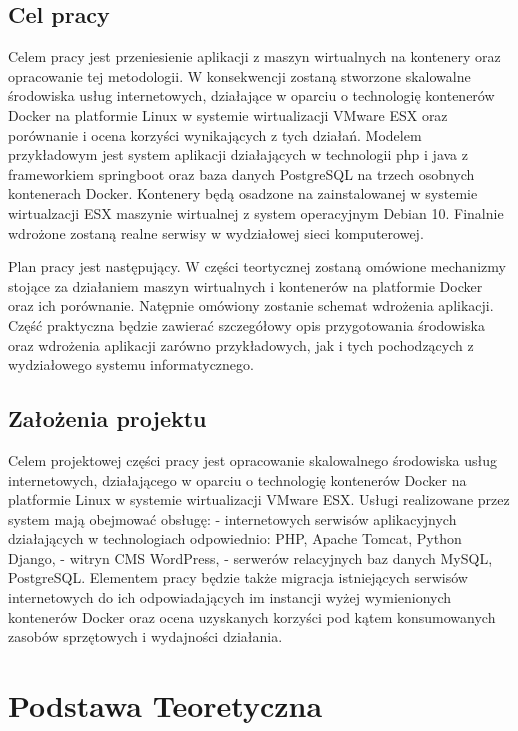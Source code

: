 \documentclass[polish, a4paper, 12pt, oneside]{book}
\begin{document}
\section{Cel pracy}
Celem pracy jest przeniesienie aplikacji z maszyn wirtualnych na kontenery oraz opracowanie tej metodologii. W konsekwencji zostaną stworzone skalowalne środowiska usług internetowych, działające w oparciu o technologię kontenerów Docker na platformie Linux w systemie wirtualizacji VMware ESX oraz porównanie i ocena korzyści wynikających z tych działań. Modelem przykładowym jest system aplikacji działających w technologii php i java z frameworkiem springboot oraz baza danych PostgreSQL na trzech osobnych kontenerach Docker. Kontenery będą osadzone na zainstalowanej w systemie wirtualzacji ESX maszynie wirtualnej z system operacyjnym Debian 10. Finalnie wdrożone zostaną realne serwisy w wydziałowej sieci komputerowej.

Plan pracy jest następujący. W części teortycznej zostaną omówione mechanizmy stojące za działaniem maszyn wirtualnych i kontenerów na platformie Docker oraz ich porównanie. Natępnie omówiony zostanie schemat wdrożenia aplikacji. Część praktyczna będzie zawierać szczegółowy opis przygotowania środowiska oraz wdrożenia aplikacji zarówno przykładowych, jak i tych pochodzących z wydziałowego systemu informatycznego. 

\section{Założenia projektu}
Celem projektowej części pracy jest opracowanie skalowalnego środowiska usług internetowych, działającego w oparciu o technologię kontenerów Docker na platformie Linux w systemie wirtualizacji VMware ESX. Usługi realizowane przez system mają obejmować obsługę: - internetowych serwisów aplikacyjnych działających w technologiach odpowiednio: PHP, Apache Tomcat, Python Django, - witryn CMS WordPress, - serwerów relacyjnych baz danych MySQL, PostgreSQL. Elementem pracy będzie także migracja istniejących serwisów internetowych do ich odpowiadających im instancji wyżej wymienionych kontenerów Docker oraz ocena uzyskanych korzyści pod kątem konsumowanych zasobów sprzętowych i wydajności działania. 

\chapter{Podstawa Teoretyczna}
\end{document}
